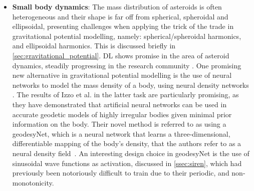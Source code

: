 \begin{itemize}
    \item \textbf{Small body dynamics}: The mass distribution of asteroids is often heterogeneous and their shape is far off from spherical, spheroidal and ellipsoidal, presenting challenges when applying the trick of the trade in gravitational potential modelling, namely: spherical/spheroidal harmonics, and ellipsoidal harmonics. This is discussed briefly in \autoref{sec:gravitational_potential}. \gls{DL} shows promise in the area of asteroid dynamics, steadily progressing in the research community \cite{carruba2022machine}. One promising new alternative in gravitational potential modelling is the use of neural networks to model the mass density of a body, using neural density networks \cite{DBLP:journals/corr/abs-1802-00121}. The results of Izzo et al. in the latter task are particularly promising, as they have demonstrated that artificial neural networks can be used in accurate geodetic models of highly irregular bodies given minimal prior information on the body. Their novel method is referred to as using a geodesyNet, which is a neural network that learns a three-dimensional, differentiable mapping of the body's density, that the authors refer to as a neural density field~\cite{IzzoGeodesyNet2021}. An interesting design choice in geodesyNet is the use of sinusoidal wave functions as activation, discussed in \autoref{ssec:siren}, which had previously been notoriously difficult to train due to their periodic, and non-monotonicity.

%

%



\end{itemize}
